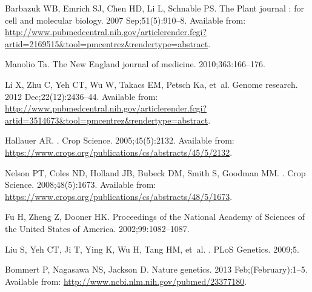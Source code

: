 \documentclass[10pt,letterpaper]{article}
\begin{document}
\begin{thebibliography}{10}
Barbazuk WB, Emrich SJ, Chen HD, Li L, Schnable PS.
\newblock The Plant journal : for cell and molecular biology. 2007
  Sep;51(5):910--8.
\newblock Available from:
  \url{http://www.pubmedcentral.nih.gov/articlerender.fcgi?artid=2169515\&tool=pmcentrez\&rendertype=abstract}.

Manolio Ta.
\newblock The New England journal of medicine. 2010;363:166--176.

Li X, Zhu C, Yeh CT, Wu W, Takacs EM, Petsch Ka, et~al.
\newblock Genome research. 2012 Dec;22(12):2436--44.
\newblock Available from:
  \url{http://www.pubmedcentral.nih.gov/articlerender.fcgi?artid=3514673\&tool=pmcentrez\&rendertype=abstract}.

Hallauer AR.
.
\newblock Crop Science. 2005;45(5):2132.
\newblock Available from:
  \url{https://www.crops.org/publications/cs/abstracts/45/5/2132}.

Nelson PT, Coles ND, Holland JB, Bubeck DM, Smith S, Goodman MM.
.
\newblock Crop Science. 2008;48(5):1673.
\newblock Available from:
  \url{https://www.crops.org/publications/cs/abstracts/48/5/1673}.

Fu H, Zheng Z, Dooner HK.
\newblock Proceedings of the National Academy of Sciences of the United States
  of America. 2002;99:1082--1087.

Liu S, Yeh CT, Ji T, Ying K, Wu H, Tang HM, et~al.
.
\newblock PLoS Genetics. 2009;5.

Bommert P, Nagasawa NS, Jackson D.
\newblock Nature genetics. 2013 Feb;(February):1--5.
\newblock Available from: \url{http://www.ncbi.nlm.nih.gov/pubmed/23377180}.


\end{thebibliography}
\end{document}
